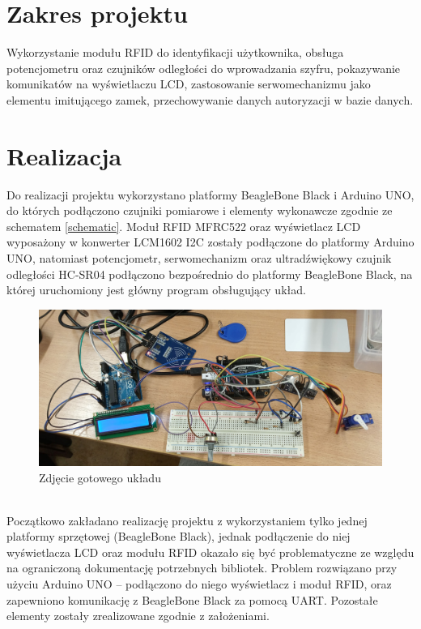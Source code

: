 \documentclass[polish,polish,a4paper]{article}
\begin{document}
	
	
	
	\section{Zakres projektu}
	Wykorzystanie modułu RFID do identyfikacji użytkownika, obsługa potencjometru oraz czujników odległości do wprowadzania szyfru, pokazywanie komunikatów na wyświetlaczu LCD, zastosowanie serwomechanizmu jako elementu imitującego zamek, przechowywanie danych autoryzacji w bazie danych.
	
	\section{Realizacja}
	Do realizacji projektu wykorzystano platformy BeagleBone Black i Arduino UNO, do których podłączono czujniki pomiarowe i elementy wykonawcze zgodnie ze schematem \ref{schematic}. Moduł RFID MFRC522 oraz wyświetlacz LCD wyposażony w konwerter LCM1602 I2C zostały podłączone do platformy Arduino UNO, natomiast potencjometr, serwomechanizm oraz ultradźwiękowy czujnik odległości HC-SR04 podłączono bezpośrednio do platformy BeagleBone Black, na której uruchomiony jest główny program obsługujący układ.
	\begin{figure}[!h]
		\includegraphics[width=\textwidth]{uklad.jpg}
		\caption{Zdjęcie gotowego układu}
	\end{figure}
	\\
	Początkowo zakładano realizację projektu z wykorzystaniem tylko jednej platformy sprzętowej (BeagleBone Black), jednak podłączenie do niej wyświetlacza LCD oraz modułu RFID okazało się być problematyczne ze względu na ograniczoną dokumentację potrzebnych bibliotek. Problem rozwiązano przy użyciu Arduino UNO – podłączono do niego wyświetlacz i moduł RFID, oraz zapewniono komunikację z BeagleBone Black za pomocą UART. Pozostałe elementy zostały zrealizowane zgodnie z założeniami.
	
\end{document}
